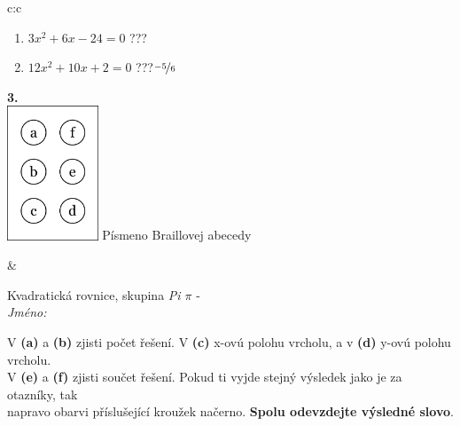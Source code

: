 \documentclass[10pt]{report}
\begin{document}
\begin{tabular}{c:c}
\begin{minipage}[c][104.5mm][t]{0.5\linewidth}
\begin{center}
\begin{minipage}{0.79\linewidth}
\begin{center}
\begin{varwidth}{\linewidth}
\begin{enumerate}
\item $3x^2+6x-24=0$\quad \dotfill\; ???\;\dotfill {}
\item $12x^2+10x+2=0$\quad \dotfill\; ???\;\dotfill \quad $\nicefrac{-5}{6}$
\end{enumerate}
\end{varwidth}
\end{center}
\end{minipage}
\begin{minipage}{0.20\linewidth}
\begin{center}
{\Huge\bfseries 3.} \\[2mm]
\includegraphics[height=40mm]{../images/braille.png}
{\small Písmeno Braillovej abecedy}
\end{center}
\end{minipage}
\end{center}
\end{minipage}
&
\begin{minipage}[c][104.5mm][t]{0.5\linewidth}
\begin{center}
\vspace{7mm}
{\huge Kvadratická rovnice, skupina \textit{Pi $\pi$} -}\\[5mm]
\textit{Jméno:}\phantom{xxxxxxxxxxxxxxxxxxxxxxxxxxxxxxxxxxxxxxxxxxxxxxxxxxxxxxxxxxxxxxxxx}\\[5mm]
\begin{minipage}{0.95\linewidth}
\begin{center}
V \textbf{(a)} a \textbf{(b)} zjisti počet řešení. V \textbf{(c)} x-ovú polohu vrcholu, a v \textbf{(d)} y-ovú polohu vrcholu.\\V \textbf{(e)} a \textbf{(f)} zjisti součet řešení. Pokud ti vyjde stejný výsledek jako je za otazníky, tak\\napravo obarvi příslušející kroužek načerno. \textbf{Spolu odevzdejte výsledné slovo}.
\end{center}
\end{minipage}
\\[1mm]
\begin{minipage}{0.79\linewidth}
\begin{center}

\end{center}
\end{minipage}
\end{center}
\end{minipage}
\end{tabular}
\end{document}
